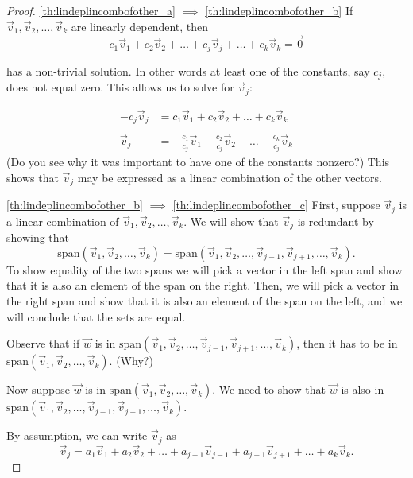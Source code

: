 \documentclass{ximera}
\begin{document}
\begin{proof}
 \ref{th:lindeplincombofother_a} $\implies$ \ref{th:lindeplincombofother_b}  If $\vec{v}_1,\vec{v}_2,\dots ,\vec{v}_k$ are linearly dependent, then 
 \begin{equation*}c_1\vec{v}_1+c_2\vec{v}_2+\ldots +c_j\vec{v}_j+\ldots +c_k\vec{v}_k=\vec{0}\end{equation*}
 
 has a non-trivial solution.  In other words at least one of the constants, say $c_j$, does not equal zero.  This allows us to solve for $\vec{v}_j$:

\begin{align*}
-c_j\vec{v}_j&=c_1\vec{v}_1+c_2\vec{v}_2+\ldots +c_k\vec{v}_k \\ \\
\vec{v}_j&=-\frac{c_1}{c_j}\vec{v}_1-\frac{c_2}{c_j}\vec{v}_2-\ldots -\frac{c_k}{c_j}\vec{v}_k
\end{align*}
(Do you see why it was important to have one of the constants nonzero?)  This shows that $\vec{v}_j$ may be expressed as a linear combination of the other vectors.

\ref{th:lindeplincombofother_b} $\implies$ \ref{th:lindeplincombofother_c}  First, suppose $\vec{v}_j$ is a linear combination of $\vec{v}_1,\vec{v}_2,\dots,\vec{v}_k$.  We will show that $\vec{v}_j$ is redundant by showing that $$\mbox{span}\left(\vec{v}_1,\vec{v}_2,\dots,\vec{v}_k\right)=\mbox{span}\left(\vec{v}_1,\vec{v}_2,\dots,\vec{v}_{j-1},\vec{v}_{j+1},\dots,\vec{v}_k\right).$$
To show equality of the two spans we will pick a vector in the left span and show that it is also an element of the span on the right.  Then, we will pick a vector in the right span and show that it is also an element of the span on the left, and we will conclude that the sets are equal.

Observe that if $\vec{w}$ is in $\mbox{span}\left(\vec{v}_1,\vec{v}_2,\dots,\vec{v}_{j-1},\vec{v}_{j+1},\dots,\vec{v}_k\right)$, then it has to be in $\mbox{span}\left(\vec{v}_1,\vec{v}_2,\dots,\vec{v}_k\right)$. (Why?)

Now suppose $\vec{w}$ is in $\mbox{span}\left(\vec{v}_1,\vec{v}_2,\dots,\vec{v}_k\right)$.  We need to show that $\vec{w}$ is also in $\mbox{span}\left(\vec{v}_1,\vec{v}_2,\dots,\vec{v}_{j-1},\vec{v}_{j+1},\dots,\vec{v}_k\right)$.

By assumption, we can write $\vec{v}_j$ as
\begin{equation}\label{eq:vj}
\vec{v}_j=a_1\vec{v}_1+a_2\vec{v}_2+\dots +a_{j-1}\vec{v}_{j-1}+a_{j+1}\vec{v}_{j+1}+\dots +a_k\vec{v}_k.
\end{equation}


\end{proof}
\end{document}
